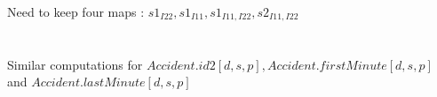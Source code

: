Need to keep four maps : $ s1_{I22}, s1_{I11}, s1_{I11, I22}, s2_{I11, I22}$\\
\\\\
Similar computations for $Accident.id2[d,s,p], Accident.firstMinute[d,s,p]$ and $Accident.lastMinute[d,s,p]$
\begin{comment}
\begin{eqnarray*}
\algnew_{+I} Accident.id2[d, s, p] &=& \algincr_{max} \algmax_{ID2} (\algincrdiff_{\cup} 
\pi_{\vec{i}} \;\sigma_{\dots}(  \{\tuple{} \} \times I2 \times I11 \times I22) \cup 
\pi_{\vec{i2}} \;\sigma_{\dots}(I \times \{\tuple{} \} \times I11 \times I22) \cup \\
&&\pi_{\vec{i11}} \;\sigma_{\dots}(I \times  I2 \times  \{\tuple{} \} \times I22) \cup 
\pi_{\vec{i22}} \;\sigma_{ \dots}(I \times I2 \times I11 \times \{\tuple{} \} ) )\\
%
\algnew_{+I}Accident.firstMinute[d, s, p] &=&  (\algincr_{min} \algmin_{TIME} (\algincrdiff_{\cup} 
\pi_{\vec{i}} \;\sigma_{\dots}(  \{\tuple{} \} \times I2 \times I11 \times I22) \cup 
\pi_{\vec{i2}} \;\sigma_{\dots}(I \times \{\tuple{} \} \times I11 \times I22) \cup \\
&&\pi_{\vec{i11}} \;\sigma_{\dots}(I \times  I2 \times  \{\tuple{} \} \times I22) \cup 
\pi_{\vec{i22}} \;\sigma_{ \dots}(I \times I2 \times I11 \times \{\tuple{} \} ) ) +90 )/60 +1\\
%
\algnew_{+I}Accident.lastMinute[d, s, p] &=& (\algincr_{max} \algmax_{TIME} (\algincrdiff_{\cup} 
\pi_{\vec{i}} \;\sigma_{\dots}(  \{\tuple{} \} \times I2 \times I11 \times I22) \cup 
\pi_{\vec{i2}} \;\sigma_{\dots}(I \times \{\tuple{} \} \times I11 \times I22) \cup \\
&&\pi_{\vec{i11}} \;\sigma_{\dots}(I \times  I2 \times  \{\tuple{} \} \times I22) \cup 
\pi_{\vec{i22}} \;\sigma_{ \dots}(I \times I2 \times I11 \times \{\tuple{} \} ) ) +120 )/60 +1\\
\end{eqnarray*}
\end{comment}
\pagebreak

